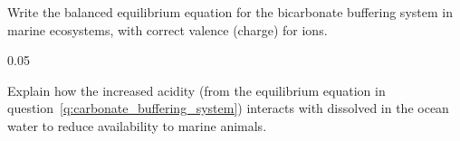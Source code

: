 \showpoints

\question[4] \label{q:carbonate_buffering_system}
Write the balanced equilibrium equation for the bicarbonate buffering system in
marine ecosystems, with correct valence (charge) for ions.  %


\begin{AnswerPage}{0.05\textheight}%
	

\end{AnswerPage}

\question[6]
Explain how the increased acidity (from the equilibrium equation in
question~\ref{q:carbonate_buffering_system}) interacts with   dissolved in the ocean water to reduce  availability to marine animals.


